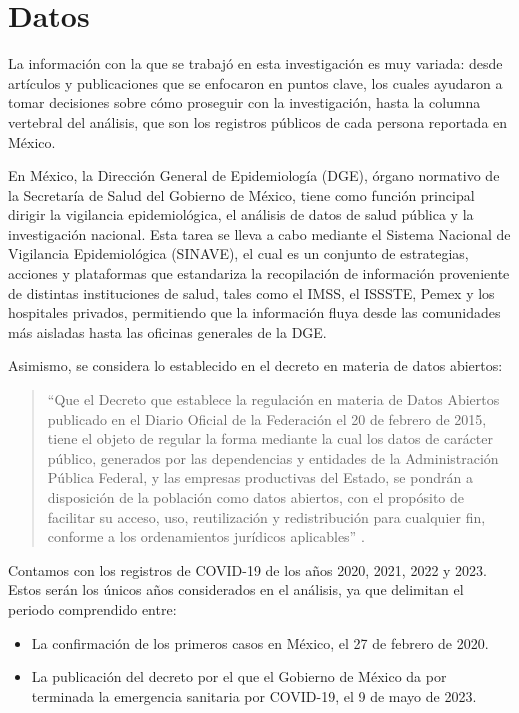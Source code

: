 \chapter{Datos}
\label{cap:datos}

La información con la que se trabajó en esta investigación es muy variada: desde artículos y publicaciones que se enfocaron en puntos clave, los cuales ayudaron a tomar decisiones sobre cómo proseguir con la investigación, hasta la columna vertebral del análisis, que son los registros públicos de cada persona reportada en México.

En México, la Dirección General de Epidemiología (DGE), órgano normativo de la Secretaría de Salud del Gobierno de México, tiene como función principal dirigir la vigilancia epidemiológica, el análisis de datos de salud pública y la investigación nacional. Esta tarea se lleva a cabo mediante el Sistema Nacional de Vigilancia Epidemiológica (SINAVE), el cual es un conjunto de estrategias, acciones y plataformas que estandariza la recopilación de información proveniente de distintas instituciones de salud, tales como el IMSS, el ISSSTE, Pemex y los hospitales privados, permitiendo que la información fluya desde las comunidades más aisladas hasta las oficinas generales de la DGE.

Asimismo, se considera lo establecido en el decreto en materia de datos abiertos:

\begin{quote}
``Que el Decreto que establece la regulación en materia de Datos Abiertos publicado en el Diario Oficial de la Federación el 20 de febrero de 2015, tiene el objeto de regular la forma mediante la cual los datos de carácter público, generados por las dependencias y entidades de la Administración Pública Federal, y las empresas productivas del Estado, se pondrán a disposición de la población como datos abiertos, con el propósito de facilitar su acceso, uso, reutilización y redistribución para cualquier fin, conforme a los ordenamientos jurídicos aplicables'' \cite{dof2015}.
\end{quote}

Contamos con los registros de COVID-19 de los años 2020, 2021, 2022 y 2023. Estos serán los únicos años considerados en el análisis, ya que delimitan el periodo comprendido entre:

\begin{itemize}
    \item La confirmación de los primeros casos en México, el 27 de febrero de 2020.
    \item La publicación del decreto por el que el Gobierno de México da por terminada la emergencia sanitaria por COVID-19, el 9 de mayo de 2023.
\end{itemize}

